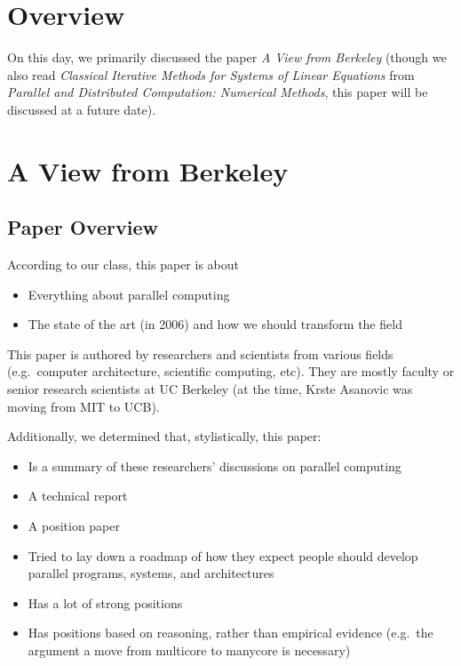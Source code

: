 



\section{Overview}\label{feb-11:overview}
On this day, we primarily discussed the paper \textit{A View from Berkeley}\cite{Asanovic:EECS-2006-183} (though we also read \textit{Classical Iterative Methods for Systems of Linear Equations} from \textit{Parallel and Distributed Computation: Numerical Methods}\cite{Bertsekas:1989:PDC:59912}, this paper will be discussed at a future date).

\section{A View from Berkeley}\label{feb-11:a-view}
\subsection{Paper Overview}\label{feb-11:a-view:overview}
According to our class, this paper is about
\begin{itemize}
    \item Everything about parallel computing
    \item The state of the art (in 2006) and how we should transform the field
\end{itemize}
This paper is authored by researchers and scientists from various fields (e.g.\ computer architecture, scientific computing, etc).
They are mostly faculty or senior research scientists at UC Berkeley (at the time, Krste Asanovic was moving from MIT to UCB).

Additionally, we determined that, stylistically, this paper:
\begin{itemize}
    \item Is a summary of these researchers' discussions on parallel computing
    \item A technical report
    \item A position paper
    \item Tried to lay down a roadmap of how they expect people should develop parallel programs, systems, and architectures
    \item Has a lot of strong positions
    \item Has positions based on reasoning, rather than empirical evidence (e.g.\ the argument a move from multicore to manycore is necessary)
\end{itemize}

